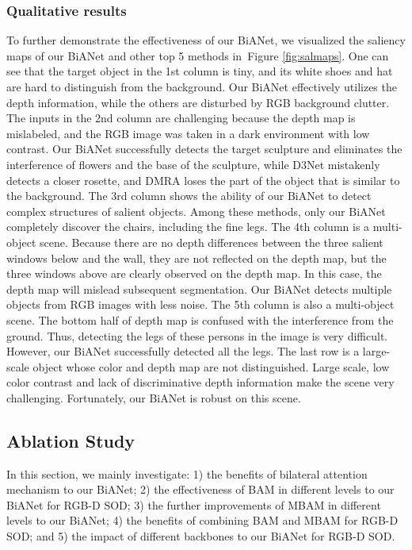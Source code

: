 \documentclass[journal]{IEEEtran}
\newcommand{\figref}[1]{Figure \ref{#1}}
\begin{document}
\subsubsection{Qualitative results}
To further demonstrate the effectiveness of our BiANet, we visualized the saliency maps of our BiANet and other top 5 methods in~\figref{fig:salmaps}.
One can see that the target object in the 1st column is tiny, and its white shoes and hat are hard to distinguish from the background. 
Our BiANet effectively utilizes the depth information, 
while the others are disturbed by RGB background clutter.
The inputs in the 2nd column are challenging because the depth map is mislabeled, and the RGB image was taken in a dark environment with low contrast.
Our BiANet successfully detects the target sculpture and eliminates the interference of flowers and the base of the sculpture,
while D3Net mistakenly detects a closer rosette, and DMRA loses the part of the object that is similar to the background.
The 3rd column shows the ability of our BiANet to detect complex structures of salient objects.
Among these methods, only our BiANet completely discover the chairs, including the fine legs.
The 4th column is a multi-object scene.
Because there are no depth differences between the three salient windows below and the wall, 
they are not reflected on the depth map, but the three windows above are clearly observed on the depth map.
In this case, the depth map will mislead subsequent segmentation.
Our BiANet detects multiple objects from RGB images with less noise.
The 5th column is also a multi-object scene. 
The bottom half of depth map is confused with the interference from the ground.
Thus, detecting the legs of these persons in the image is very difficult.
However, our BiANet successfully detected all the legs.
The last row is a large-scale object whose color and depth map are not distinguished.
Large scale, low color contrast and lack of discriminative depth information make the scene very challenging.
Fortunately, our BiANet is robust on this scene.

\subsection{Ablation Study}
\label{sec:expvalid}
\vspace{-1mm}
In this section, we mainly investigate: 1) the benefits of bilateral attention mechanism to our BiANet; 2) the effectiveness of BAM in different levels to our BiANet for RGB-D SOD; 3) the further improvements of MBAM in different levels to our BiANet; 4) the benefits of combining BAM and MBAM for RGB-D SOD; and 5) the impact of different backbones to our BiANet for RGB-D SOD.\
\end{document}
